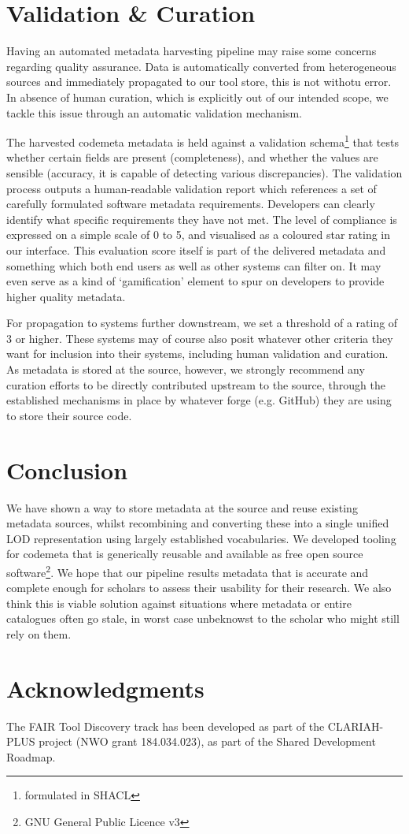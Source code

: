 \documentclass[a4paper,11pt]{article}
\begin{document}
\section{Validation \& Curation}

Having an automated metadata harvesting pipeline may raise some concerns
regarding quality assurance. Data is automatically converted from heterogeneous
sources and immediately propagated to our tool store, this is not withotu
error. In absence of human curation, which is explicitly out of our intended
scope, we tackle this issue through an automatic validation mechanism.

The harvested codemeta metadata is held against a validation
schema\footnote{formulated in SHACL} that tests whether certain fields are
present (completeness), and whether the values are sensible (accuracy, it is
capable of detecting various discrepancies). The validation process outputs a
human-readable validation report which references a set of carefully formulated
software metadata requirements. Developers can clearly identify what
specific requirements they have not met. The level of compliance is expressed on a
simple scale of 0 to 5, and visualised as a coloured star rating in our
interface. This evaluation score itself is part of the delivered metadata and
something which both end users as well as other systems can filter on. It may
even serve as a kind of `gamification' element to spur on developers to provide
higher quality metadata. 

For propagation to systems further downstream, we set a threshold of a rating
of 3 or higher. These systems may of course also posit whatever other criteria
they want for inclusion into their systems, including human validation and
curation. As metadata is stored at the source, however, we strongly recommend
any curation efforts to be directly contributed upstream to the source, through
the established mechanisms in place by whatever forge (e.g. GitHub) they are
using to store their source code.

\section{Conclusion}

We have shown a way to store metadata at the source and reuse existing metadata
sources, whilst recombining and converting these into a single unified LOD
representation using largely established vocabularies. We developed tooling for
codemeta that is generically reusable and available as free open source
software\footnote{GNU General Public Licence v3}. We hope that our pipeline
results metadata that is accurate and complete enough for scholars to assess
their usability for their research. We also think this is viable solution
against situations where metadata or entire catalogues often go stale, in worst
case unbeknowst to the scholar who might still rely on them.

\section*{Acknowledgments}

The FAIR Tool Discovery track has been developed as part of the CLARIAH-PLUS
project (NWO grant 184.034.023), as part of the Shared Development Roadmap.

\printbibliography
\end{document}
